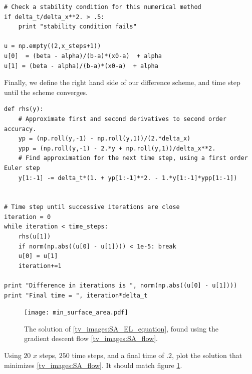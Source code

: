 \begin{lstlisting}
# Check a stability condition for this numerical method
if delta_t/delta_x**2. > .5:
	print "stability condition fails"
	
u = np.empty((2,x_steps+1))
u[0]  = (beta - alpha)/(b-a)*(x0-a)  + alpha
u[1] = (beta - alpha)/(b-a)*(x0-a)  + alpha
\end{lstlisting}

Finally, we define the right hand side of our difference scheme, and time step until the scheme converges. 
\begin{lstlisting}
def rhs(y):
	# Approximate first and second derivatives to second order accuracy.
	yp = (np.roll(y,-1) - np.roll(y,1))/(2.*delta_x)
	ypp = (np.roll(y,-1) - 2.*y + np.roll(y,1))/delta_x**2.
	# Find approximation for the next time step, using a first order Euler step
	y[1:-1] -= delta_t*(1. + yp[1:-1]**2. - 1.*y[1:-1]*ypp[1:-1])


# Time step until successive iterations are close
iteration = 0
while iteration < time_steps:
	rhs(u[1])
	if norm(np.abs((u[0] - u[1]))) < 1e-5: break
	u[0] = u[1]
	iteration+=1

print "Difference in iterations is ", norm(np.abs((u[0] - u[1])))
print "Final time = ", iteration*delta_t
\end{lstlisting}

\begin{figure}
\centering
\texttt{[image: min\_surface\_area.pdf]}
\caption{The solution of \eqref{tv_images:SA_EL_equation}, found using the gradient descent flow \eqref{tv_images:SA_flow}.}
\label{fig:tv_images:SA_image}
\end{figure}

\begin{problem}
Using $20$ $x$ steps, $250$ time steps, and a final time of $.2$, plot the solution that minimizes \eqref{tv_images:SA_flow}.
It should match figure \ref{fig:tv_images:SA_image}.

\end{problem}

